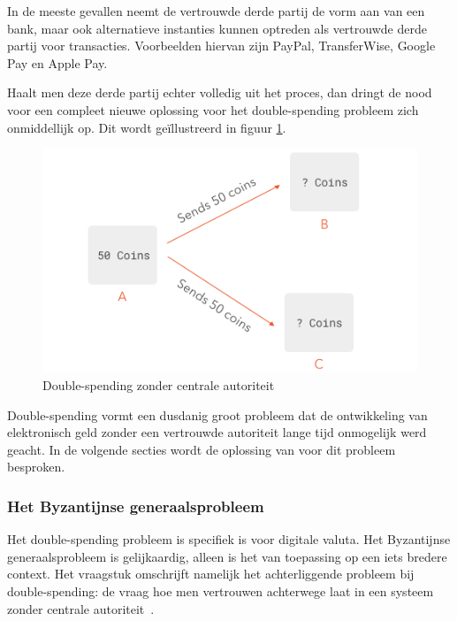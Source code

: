 			In de meeste gevallen neemt de vertrouwde derde partij de vorm aan van een bank, maar ook alternatieve instanties kunnen optreden als vertrouwde derde partij voor transacties. Voorbeelden hiervan zijn PayPal, TransferWise, Google Pay en Apple Pay.
		
			Haalt men deze derde partij echter volledig uit het proces, dan dringt de nood voor een compleet nieuwe oplossing voor het double-spending probleem zich onmiddellijk op.  Dit wordt geïllustreerd in figuur \ref{fig:double_spending1}.
			
			\begin{figure}
				\includegraphics[width=\linewidth]{img/double_spending1.png}
				\caption{Double-spending zonder centrale autoriteit~\autocite{Peyrott2017}}
				\label{fig:double_spending1}
			\end{figure}
		
			Double-spending vormt een dusdanig groot probleem dat  de ontwikkeling van elektronisch geld zonder een vertrouwde autoriteit lange tijd onmogelijk werd geacht. In de volgende secties wordt de oplossing van \textcite{Nakamoto2008} voor dit probleem besproken. 
			
			\subsubsection{Het Byzantijnse generaalsprobleem}
			Het double-spending probleem is specifiek is voor digitale valuta. Het Byzantijnse generaalsprobleem is gelijkaardig, alleen is het van toepassing op een iets bredere context. Het vraagstuk omschrijft namelijk het achterliggende probleem bij double-spending: de vraag hoe men vertrouwen achterwege laat in een systeem zonder centrale autoriteit~\autocite{Lamport1982}.
			
